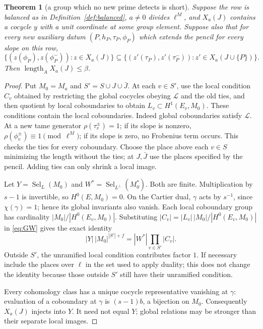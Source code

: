 \documentclass[11pt,a4paper]{article}
\newtheorem{theorem}{Theorem}[section]
\theoremstyle{definition}
\newcommand{\length}{\operatorname{length}}
\begin{document}
\begin{theorem}[a group which no new prime detects is short]
\label{thm:unseen}
Suppose the row is balanced as in
Definition~\ref{def:balanced}, \(a\ne0\) divides \(\ell^M\),
and \(X_a(J)\) contains a cocycle \(y\) with a unit
coordinate at some group element.
Suppose also that for every new auxiliary datum
\((P,h_P,\tau_P,\phi_P)\) which extends the pencil for
every slope on this row,
\begin{equation}\label{eq:unseen-inclusion}
 \{(z(\phi_P),z(\phi_P^-)):z\in X_a(J)\}
 \subseteq
 \{(z'(\tau_P),z'(\tau_P^-)):
                      z'\in X_a(J\cup\{P\})\}.
\end{equation}
Then \(\length_A X_a(J)\le\beta\).
\end{theorem}
\begin{proof}
Put \(M_0=M_a\) and \(S'=S\cup J\cup\bar J\).
At each \(v\in S'\), use the local condition \(C_v\) obtained
by restricting the global cocycles obeying \(\mathcal L\)
and the old ties, and then quotient by local coboundaries
to obtain \(L_v\subset H^1(E_v,M_0)\).
These conditions contain the local coboundaries.
Indeed global coboundaries satisfy \(\mathcal L\).
At a new tame generator \(\rho(\tau_v^\pm)=1\);
if its slope is nonzero,
\(\rho(\phi_v^\pm)\equiv1\pmod{\ell^M}\);
if its slope is zero, no Frobenius term occurs.
This checks the ties for every coboundary.
Choose the place above each \(v\in S\) minimizing the
length without the ties; at \(J,\bar J\) use the places
specified by the pencil. Adding ties can only shrink
a local image.

Let \(Y=\operatorname{Sel}_L(M_0)\) and
\(W^*=\operatorname{Sel}_{L^\perp}(M_0^*)\).
Both are finite. Multiplication by \(s-1\) is invertible,
so \(H^0(E,M_0)=0\). On the Cartier dual, \(\gamma\)
acts by \(s^{-1}\), since \(\chi(\gamma)=1\);
hence its global invariants also vanish.
Each local coboundary group has cardinality
\(|M_0|/|H^0(E_v,M_0)|\). Substituting
\(|C_v|=|L_v|\,|M_0|/|H^0(E_v,M_0)|\)
in \eqref{eq:GW} gives the exact identity
\begin{equation}\label{eq:GW-cocycles}
 |Y|\,|M_0|^{|S'|+f}=|W^*|\prod_{v\in S'}|C_v|.
\end{equation}
Outside \(S'\), the unramified local condition contributes
factor \(1\). If necessary include the places over \(\ell\)
in the set used to apply duality; this does not change the
identity because those outside \(S'\) still have their
unramified condition.

Every cohomology class has a unique cocycle representative
vanishing at \(\gamma\): evaluation of a coboundary at
\(\gamma\) is \((s-1)b\), a bijection on \(M_0\).
Consequently \(X_a(J)\) injects into \(Y\).
It need not equal \(Y\); global relations may be stronger
than their separate local images.


\end{proof}
\end{document}
